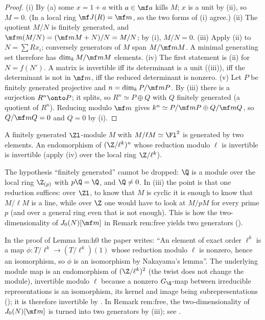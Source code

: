 \begin{proof}
(i) By (a) some $x=1+a$ with $a\in\mf a$ kills $M$; $x$ is a unit by
(ii), so $M=0$. (In a local ring $\mf J(R)=\mf m$, so the two forms of (i) agree.) (ii) The quotient
$M/N$ is finitely generated, and $\mf m(M/N)=(\mf mM+N)/N=M/N$; by (i), $M/N=0$. (iii) Apply (ii) to
$N=\sum Rx_i$; conversely generators of $M$ span $M/\mf mM$. A minimal generating set therefore has $\dim_kM/\mf mM$ elements.
(iv) The first statement is (ii) for $N=f(N')$. A matrix is invertible iff its determinant is a unit
((iii)), iff the determinant is not in $\mf m$, iff the reduced determinant is nonzero.
(v) Let $P$ be finitely generated projective and $n=\dim_kP/\mf mP$. By (iii) there is a surjection $R^n\onto P$; it splits, so
$R^n\simeq P\oplus Q$ with $Q$ finitely generated (a quotient of $R^n$). Reducing modulo $\mf m$ gives $k^n\simeq P/\mf mP\oplus Q/\mf mQ$,
so $Q/\mf mQ=0$ and $Q=0$ by (i).
\end{proof}

\begin{example}\label{ex:modules:nakayama}
A finitely generated $\Zl$-module $M$ with $M/\ell M\simeq\Fl^2$ is generated by two elements. An endomorphism of $(\Z/\ell^k)^n$ whose
reduction modulo $\ell$ is invertible is invertible (apply (iv) over the local ring $\Z/\ell^k$).
\end{example}

The hypothesis ``finitely generated'' cannot be dropped: $\Q$ is a module over the local ring $\Z_{(p)}$ with $p\Q=\Q$, and $\Q\ne0$. In
(iii) the point is that one reduction suffices: over $\Zl$, to know that $M$ is cyclic it is enough to know that $M/\ell M$ is a line,
while over $\Z$ one would have to look at $M/pM$ for every prime $p$ (and over a general ring even that is not enough). This is how
the two-dimensionality of $J_0(N)[\mf m]$ in Remark rem:free yields two generators ().

\begin{paperlink}\label{pl:modules:nakayama}
In the proof of Lemma lem:h0 the paper writes: ``An element of exact order $\ell^k$ is a map $\phi\colon T/\ell^k\to(T/\ell^k)(1)$ whose
reduction modulo $\ell$ is nonzero, hence an isomorphism, so $\phi$ is an isomorphism by Nakayama's lemma''. The underlying
module map is an endomorphism of $(\Z/\ell^k)^2$ (the twist does not change the module), invertible modulo $\ell$ because a nonzero
$G_\Q$-map between irreducible representations is an isomorphism, its kernel and image being subrepresentations (); it
is therefore invertible by . In Remark rem:free, the two-dimensionality of $J_0(N)[\mf m]$ is turned into
two generators by (iii); see .
\end{paperlink}

